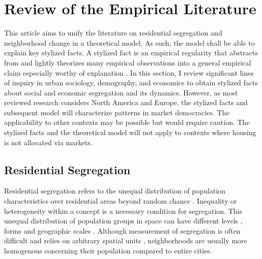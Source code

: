 \section{Review of the Empirical Literature}

This article aims to unify the literature on residential segregation and neighborhood change in a theoretical model. As such, the model shall be able to explain key stylized facts. A stylized fact is an empirical regularity that abstracts from and lightly theorizes many empirical observations into a general empirical claim especially worthy of explanation \citep{hirschmanStylizedFactsSocial2016}. In this section, I review significant lines of inquiry in urban sociology, demography, and economics to obtain stylized facts about social and economic segregation and its dynamics. However, as most reviewed research considers North America and Europe, the stylized facts and subsequent model will characterize patterns in market democracies. The applicability to other contexts may be possible but would require caution. The stylized facts and the theoretical model will not apply to contexts where housing is not allocated via markets. 


\subsection{Residential Segregation}

Residential segregation refers to the unequal distribution of population characteristics over residential areas beyond random chance \citep{masseyDimensionsResidentialSegregation1988, reardonNewApproachMeasuring2006}. Inequality or heterogeneity within a concept is a necessary condition for segregation. This unequal distribution of population groups in space can have different levels \citep{oecdDividedCitiesUnderstanding2018}, forms \citep{masseyDimensionsResidentialSegregation1988} and geographic scales \citep{leeCensusTractPatterns2008}. Although measurement of segregation is often difficult and relies on arbitrary spatial units \citep{reardonNewApproachMeasuring2006, leeCensusTractPatterns2008, leung-gagneItSurprisinglyDifficult2023}, neighborhoods are usually more homogenous concerning their population compared to entire cities.

